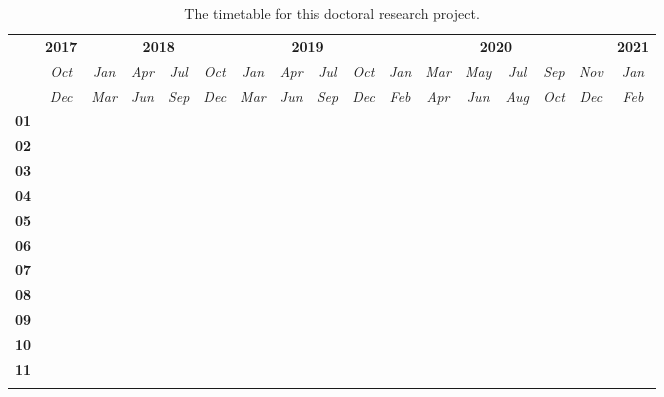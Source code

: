 \begin{table}[htb]
  \renewcommand{\arraystretch}{1.4}
  \caption{The timetable for this doctoral research project.}
  \label{tab:timetable}
  \tiny
  \centering
  \begin{tabular}{c|c|cccc|cccc|cccccc|c}
    \toprule
    & {\bf 2017}
    & \multicolumn{4}{c|}{{\bf 2018}}
    & \multicolumn{4}{c|}{{\bf 2019}}
    & \multicolumn{6}{c|}{{\bf 2020}}
    & {\bf 2021} \\

    & {\it Oct} & {\it Jan} & {\it Apr} & {\it Jul} & {\it Oct} & {\it Jan} &
    {\it Apr} & {\it Jul} & {\it Oct} & {\it Jan} & {\it Mar} & {\it May} &
    {\it Jul} & {\it Sep} & {\it Nov} & {\it Jan} \\

    & {\it Dec} & {\it Mar} & {\it Jun} & {\it Sep} & {\it Dec} & {\it Mar} &
    {\it Jun} & {\it Sep} & {\it Dec} & {\it Feb} & {\it Apr} & {\it Jun} &
    {\it Aug} & {\it Oct} & {\it Dec} & {\it Feb} \\
    \hline %
    \arrayrulecolor{lightgray}

    {\bf 01} & \m & \m &    &    &    &    &    &    &    &    &    &    &    &    &    &    \\ \hline
    {\bf 02} &    & \m &    &    &    &    &    &    &    &    &    &    &    &    &    &    \\ \hline
    {\bf 03} &    & \m & \m & \m & \m &    &    &    &    &    &    &    &    &    &    &    \\ \hline
    {\bf 04} &    &    &    & \m & \m & \m &    &    &    &    &    &    &    &    &    &    \\ \hline
    {\bf 05} &    &    &    &    &    & \m & \m & \m &    &    &    &    &    &    &    &    \\ \hline
    {\bf 06} &    &    &    &    &    &    &    & \m & \m &    &    &    &    &    &    &    \\ \hline
    {\bf 07} &    &    &    &    &    &    &    &    & \x & \x &    &    &    &    &    &    \\ \hline
    {\bf 08} &    &    &    &    &    &    &    &    & \x & \x & \x &    &    &    &    &    \\ \hline
    {\bf 09} &    &    &    &    &    &    &    &    &    & \x & \x & \x & \x & \x &    &    \\ \hline
    {\bf 10} &    &    &    &    &    &    &    &    &    &    &    & \x & \x & \x & \x &    \\ \hline
    {\bf 11} &    &    &    &    &    &    &    &    &    &    &    &    &    & \x & \x & \x \\

    \arrayrulecolor{black}
    \bottomrule
  \end{tabular}
\end{table}




